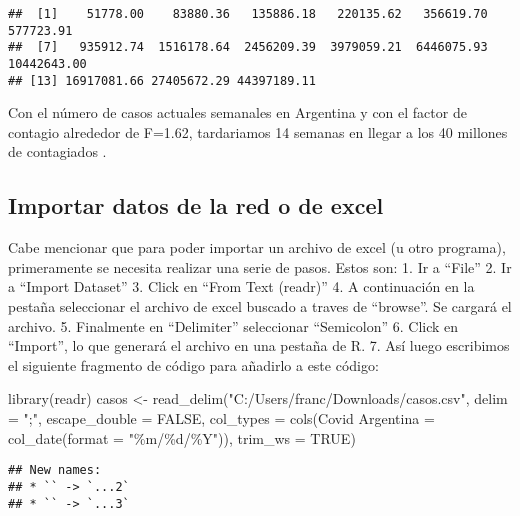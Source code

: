 \documentclass[]{elsarticle} %
\newenvironment{Shaded}{\begin{snugshade}}{\end{snugshade}}
\newcommand{\AttributeTok}[1]{\textcolor[rgb]{0.77,0.63,0.00}{#1}}
\newcommand{\ConstantTok}[1]{\textcolor[rgb]{0.00,0.00,0.00}{#1}}
\newcommand{\FunctionTok}[1]{\textcolor[rgb]{0.00,0.00,0.00}{#1}}
\newcommand{\NormalTok}[1]{#1}
\newcommand{\OtherTok}[1]{\textcolor[rgb]{0.56,0.35,0.01}{#1}}
\newcommand{\StringTok}[1]{\textcolor[rgb]{0.31,0.60,0.02}{#1}}
\begin{document}
\begin{verbatim}
##  [1]    51778.00    83880.36   135886.18   220135.62   356619.70   577723.91
##  [7]   935912.74  1516178.64  2456209.39  3979059.21  6446075.93 10442643.00
## [13] 16917081.66 27405672.29 44397189.11
\end{verbatim}

Con el número de casos actuales semanales en Argentina y con el factor
de contagio alrededor de F=1.62, tardariamos 14 semanas en llegar a los
40 millones de contagiados .

\hypertarget{importar-datos-de-la-red-o-de-excel}{%
\subsection{Importar datos de la red o de
excel}\label{importar-datos-de-la-red-o-de-excel}}

Cabe mencionar que para poder importar un archivo de excel (u otro
programa), primeramente se necesita realizar una serie de pasos. Estos
son: 1. Ir a ``File'' 2. Ir a ``Import Dataset'' 3. Click en ``From Text
(readr)'' 4. A continuación en la pestaña seleccionar el archivo de
excel buscado a traves de ``browse''. Se cargará el archivo. 5.
Finalmente en ``Delimiter'' seleccionar ``Semicolon'' 6. Click en
``Import'', lo que generará el archivo en una pestaña de R. 7. Así luego
escribimos el siguiente fragmento de código para añadirlo a este código:

\begin{Shaded}
\begin{Highlighting}[]
\FunctionTok{library}\NormalTok{(readr)}
\NormalTok{casos }\OtherTok{\textless{}{-}} \FunctionTok{read\_delim}\NormalTok{(}\StringTok{"C:/Users/franc/Downloads/casos.csv"}\NormalTok{, }
    \AttributeTok{delim =} \StringTok{";"}\NormalTok{, }\AttributeTok{escape\_double =} \ConstantTok{FALSE}\NormalTok{, }\AttributeTok{col\_types =} \FunctionTok{cols}\NormalTok{(}\StringTok{\textasciigrave{}}\AttributeTok{Covid Argentina}\StringTok{\textasciigrave{}} \OtherTok{=} \FunctionTok{col\_date}\NormalTok{(}\AttributeTok{format =} \StringTok{"\%m/\%d/\%Y"}\NormalTok{)), }
    \AttributeTok{trim\_ws =} \ConstantTok{TRUE}\NormalTok{)}
\end{Highlighting}
\end{Shaded}

\begin{verbatim}
## New names:
## * `` -> `...2`
## * `` -> `...3`
\end{verbatim}
\end{document}
